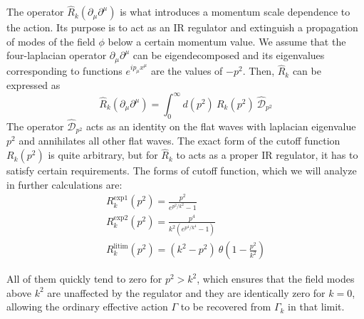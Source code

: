 \documentclass[11pt, a4paper]{article}
\begin{document}
The operator $\hat{R}_k (\partial_{\mu}\partial^{\mu})$ is what introduces a momentum scale dependence to the action.
Its purpose is to act as an IR regulator and extinguish a propagation of modes of the field $\phi$ below a certain momentum value.
We assume that the four-laplacian operator $\partial_{\mu}\partial^{\mu}$ can be eigendecomposed and its eigenvalues corresponding to functions $e^{ip_\mu x^\mu}$ are the values of $-p^2$.
Then, $\hat{R}_k$ can be expressed as
\begin{equation}
    \hat{R}_k (\partial_{\mu}\partial^{\mu}) = \int_0^{\infty} d(p^2) \ R_k(p^2) \ \hat{\mathcal{D}}_{p^2}
\end{equation}
The operator $\hat{\mathcal{D}}_{p^2}$ acts as an identity on the flat waves with laplacian eigenvalue $p^2$ and annihilates all other flat waves.
The exact form of the cutoff function $R_k(p^2)$ is quite arbitrary, but for $\hat{R}_k$ to acts as a proper IR regulator, it has to satisfy certain requirements.
The forms of cutoff function, which we will analyze in further calculations are:
\begin{gather}
    R_k^{\text{exp1}}(p^2) = \frac{p^2}{e^{p^2/k^2} - 1}\\
    R_k^{\text{exp2}}(p^2) = \frac{p^4}{k^2(e^{p^4/k^4} - 1)}\\
    R_k^{\text{litim}}(p^2) = (k^2-p^2) \ \theta \left(1-\frac{p^2}{k^2}\right)
\end{gather}

All of them quickly tend to zero for $p^2 > k^2$, which ensures that the field modes above $k^2$ are unaffected by the regulator
and they are identically zero for $k = 0$, allowing the ordinary effective action $\Gamma$ to be recovered from $\Gamma_k$ in that limit.



\end{document}
